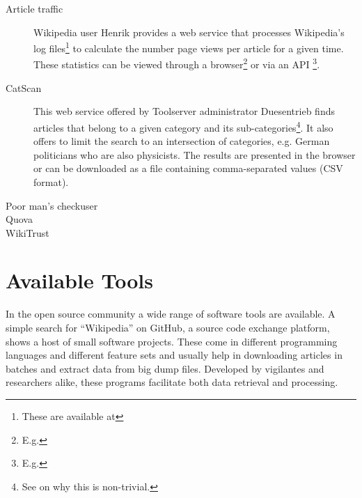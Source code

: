 \begin{description}
\item[Article traffic] Wikipedia user Henrik provides a web service that processes Wikipedia's log files\footnote{These are available at } to calculate the number page views per article for a given time.
These statistics can be viewed through a browser\footnote{E.g. } or via an API \footnote{E.g. }. 
\item[CatScan] This web service offered by Toolserver administrator Duesentrieb finds articles that belong to a given category and its sub-categories\footnote{See  on why this is non-trivial.}.
It also offers to limit the search to an intersection of categories, e.g. German politicians who are also physicists.
The results are presented in the browser or can be downloaded as a file containing comma-separated values (CSV format). 
\item[Poor man's checkuser] 
\item[Quova] 
\item[WikiTrust] 
\end{description}


\section{Available Tools}

In the open source community a wide range of software tools are available.
A simple search for ``Wikipedia'' on GitHub, a source code exchange platform, shows a host of small software projects.
These come in different programming languages and different feature sets and usually help in downloading articles in batches and extract data from big dump files. 
Developed by vigilantes and researchers alike, these programs facilitate both data retrieval and processing.

